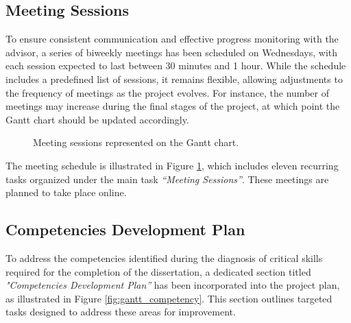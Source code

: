 \subsection{Meeting Sessions}

To ensure consistent communication and effective progress monitoring with the advisor, a series of biweekly meetings has been scheduled on Wednesdays, with each session expected to last between 30 minutes and 1 hour. While the schedule includes a predefined list of sessions, it remains flexible, allowing adjustments to the frequency of meetings as the project evolves. For instance, the number of meetings may increase during the final stages of the project, at which point the Gantt chart should be updated accordingly.

\begin{figure}
      \centering
      \caption{Meeting sessions represented on the Gantt chart.}
      \label{fig:gantt_meetings}
\end{figure}

The meeting schedule is illustrated in Figure \ref{fig:gantt_meetings}, which includes eleven recurring tasks organized under the main task \textit{“Meeting Sessions”}. These meetings are planned to take place online.

\subsection{Competencies Development Plan}

To address the competencies identified during the diagnosis of critical skills required for the completion of the dissertation, a dedicated section titled \textit{"Competencies Development Plan”} has been incorporated into the project plan, as illustrated in Figure \ref{fig:gantt_competency}. This section outlines targeted tasks designed to address these areas for improvement.

